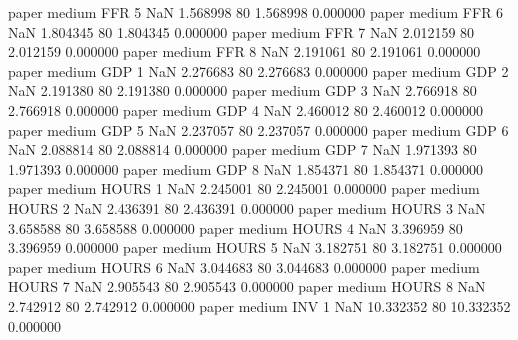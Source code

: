             paper     medium      FFR                 5                  NaN  1.568998 80       1.568998           0.000000
            paper     medium      FFR                 6                  NaN  1.804345 80       1.804345           0.000000
            paper     medium      FFR                 7                  NaN  2.012159 80       2.012159           0.000000
            paper     medium      FFR                 8                  NaN  2.191061 80       2.191061           0.000000
            paper     medium      GDP                 1                  NaN  2.276683 80       2.276683           0.000000
            paper     medium      GDP                 2                  NaN  2.191380 80       2.191380           0.000000
            paper     medium      GDP                 3                  NaN  2.766918 80       2.766918           0.000000
            paper     medium      GDP                 4                  NaN  2.460012 80       2.460012           0.000000
            paper     medium      GDP                 5                  NaN  2.237057 80       2.237057           0.000000
            paper     medium      GDP                 6                  NaN  2.088814 80       2.088814           0.000000
            paper     medium      GDP                 7                  NaN  1.971393 80       1.971393           0.000000
            paper     medium      GDP                 8                  NaN  1.854371 80       1.854371           0.000000
            paper     medium    HOURS                 1                  NaN  2.245001 80       2.245001           0.000000
            paper     medium    HOURS                 2                  NaN  2.436391 80       2.436391           0.000000
            paper     medium    HOURS                 3                  NaN  3.658588 80       3.658588           0.000000
            paper     medium    HOURS                 4                  NaN  3.396959 80       3.396959           0.000000
            paper     medium    HOURS                 5                  NaN  3.182751 80       3.182751           0.000000
            paper     medium    HOURS                 6                  NaN  3.044683 80       3.044683           0.000000
            paper     medium    HOURS                 7                  NaN  2.905543 80       2.905543           0.000000
            paper     medium    HOURS                 8                  NaN  2.742912 80       2.742912           0.000000
            paper     medium      INV                 1                  NaN 10.332352 80      10.332352           0.000000
